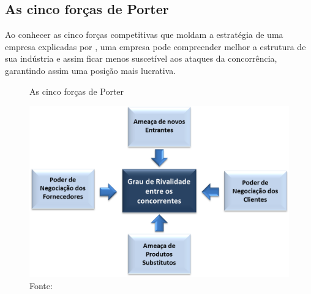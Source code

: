 \subsection{As cinco forças de Porter}
\label{cinco_forças_porter}
Ao conhecer as cinco forças competitivas que moldam a estratégia de uma empresa explicadas por , uma empresa pode compreender melhor a estrutura de sua indústria e assim ficar menos suscetível aos ataques da concorrência, garantindo assim uma posição mais lucrativa.


\begin{figure}[H]
\caption{As cinco forças de Porter}
\centerline{\includegraphics[scale=0.7]{img/cinco_forcas}}
\label{fig:cinco_forcas}
\caption* {Fonte: }
\end{figure}